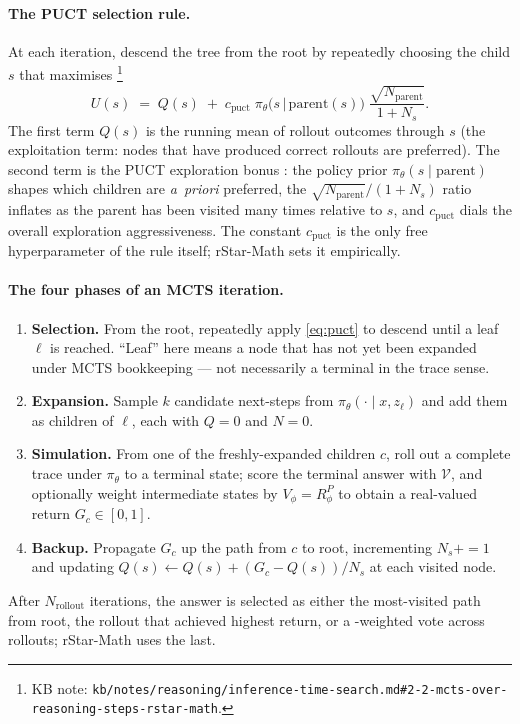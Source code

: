 \paragraph{The PUCT selection rule.} At each iteration, descend the tree
from the root by repeatedly choosing the child $s$ that maximises%
\footnote{KB note:
\texttt{kb/notes/reasoning/inference-time-search.md\#2-2-mcts-over-reasoning-steps-rstar-math}.}
\begin{equation}
  U(s) \;=\; Q(s) \;+\; c_\text{puct}\;
              \pi_\theta\!\bigl(s \,\big|\, \text{parent}(s)\bigr)\;
              \frac{\sqrt{N_\text{parent}}}{1 + N_s}.
  \label{eq:puct}
\end{equation}
The first term $Q(s)$ is the running mean of rollout outcomes through
$s$ (the exploitation term: nodes that have produced correct rollouts
are preferred). The second term is the PUCT exploration bonus
\citep{rstar-math2025}: the policy prior
$\pi_\theta(s \mid \text{parent})$ shapes which children are
\emph{a~priori} preferred, the
$\sqrt{N_\text{parent}}/(1 + N_s)$ ratio inflates as the parent has
been visited many times relative to $s$, and $c_\text{puct}$ dials the
overall exploration aggressiveness. The constant $c_\text{puct}$ is
the only free hyperparameter of the rule itself; rStar-Math sets it
empirically.

\paragraph{The four phases of an MCTS iteration.}
\begin{enumerate}
\item \textbf{Selection.} From the root, repeatedly apply
\cref{eq:puct} to descend until a leaf $\ell$ is reached. ``Leaf'' here
means a node that has not yet been expanded under MCTS bookkeeping ---
not necessarily a terminal in the trace sense.
\item \textbf{Expansion.} Sample $k$ candidate next-steps from
$\pi_\theta(\cdot \mid x, z_{\ell})$ and add them as children of
$\ell$, each with $Q = 0$ and $N = 0$.
\item \textbf{Simulation.} From one of the freshly-expanded children
$c$, roll out a complete trace under $\pi_\theta$ to a terminal state;
score the terminal answer with $\mathcal{V}$, and optionally weight
intermediate states by $V_\phi = R^P_\phi$ to obtain a real-valued
return $G_c \in [0, 1]$.
\item \textbf{Backup.} Propagate $G_c$ up the path from $c$ to root,
incrementing $N_s \mathrel{{+}{=}} 1$ and updating
$Q(s) \mathrel{{\leftarrow}} Q(s) + (G_c - Q(s))/N_s$ at each visited
node.
\end{enumerate}
After $N_\text{rollout}$ iterations, the answer is selected as either
the most-visited path from root, the rollout that achieved highest
return, or a -weighted vote across rollouts; rStar-Math uses the
last.

